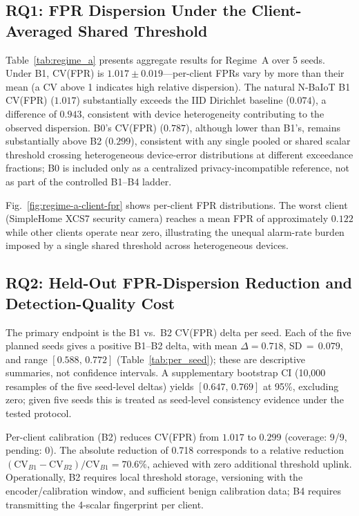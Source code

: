 \subsection{RQ1: FPR Dispersion Under the Client-Averaged Shared Threshold}

Table~\ref{tab:regime_a} presents aggregate results for Regime~A over 5 seeds.
Under B1, CV(FPR) is $1.017 \pm 0.019$---per-client FPRs vary by more than their mean
(a CV above 1 indicates high relative dispersion).
The natural N-BaIoT B1 CV(FPR) ($1.017$) substantially exceeds the IID Dirichlet
baseline ($0.074$), a difference of $0.943$, consistent with device heterogeneity
contributing to the observed dispersion.
B0's CV(FPR) ($0.787$), although lower than B1's, remains substantially above B2 ($0.299$),
consistent with any single pooled or shared scalar threshold crossing heterogeneous
device-error distributions at different exceedance fractions; B0 is included only as a
centralized privacy-incompatible reference, not as part of the controlled B1--B4 ladder.

Fig.~\ref{fig:regime-a-client-fpr} shows per-client FPR distributions.
The worst client (SimpleHome XCS7 security camera) reaches a mean FPR of approximately
$0.122$ while other clients operate near zero, illustrating the unequal alarm-rate
burden imposed by a single shared threshold across heterogeneous devices.

\subsection{RQ2: Held-Out FPR-Dispersion Reduction and Detection-Quality Cost}

The primary endpoint is the B1 vs.\ B2 CV(FPR) delta per seed.
Each of the five planned seeds gives a positive B1--B2 delta, with mean
$\Delta = 0.718$, SD$\,{=}\,0.079$, and range $[0.588,\, 0.772]$
(Table~\ref{tab:per_seed}); these are descriptive summaries, not confidence intervals.
A supplementary bootstrap CI (10{,}000 resamples of the five seed-level deltas)
yields $[0.647,\, 0.769]$ at 95\%, excluding zero; given five seeds this is
treated as seed-level consistency evidence under the tested protocol.

Per-client calibration (B2) reduces CV(FPR) from $1.017$ to $0.299$ (coverage: 9/9, pending: 0).
The absolute reduction of 0.718 corresponds to a relative reduction
$(\mathrm{CV}_{B1}-\mathrm{CV}_{B2})/\mathrm{CV}_{B1}=70.6\%$,
achieved with zero additional threshold uplink.
Operationally, B2 requires local threshold storage, versioning with the encoder/calibration window, and sufficient benign calibration data;
B4 requires transmitting the 4-scalar fingerprint per client.

